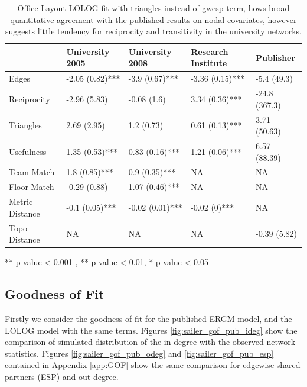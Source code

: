\documentclass[
]{statsoc}
\begin{document}
\begin{table}

\caption{\label{tab:unnamed-chunk-5}\label{tab:sailer_lolog_tri} Office Layout LOLOG fit with triangles instead of gwesp term, hows broad quantitative agreement with the published results on nodal covariates, however suggests little tendency for reciprocity and transitivity in the university networks.}
\centering
\begin{threeparttable}
\begin{tabular}[t]{lllll}
\toprule
  & University 2005 & University 2008 & Research Institute & Publisher\\
\midrule
\rowcolor{gray!6}  Edges & -2.05 (0.82)*** & -3.9 (0.67)*** & -3.36 (0.15)*** & -5.4 (49.3)\\
Reciprocity & -2.96 (5.83) & -0.08 (1.6) & 3.34 (0.36)*** & -24.8 (367.3)\\
\rowcolor{gray!6}  Triangles & 2.69 (2.95) & 1.2 (0.73) & 0.61 (0.13)*** & 3.71 (50.63)\\
Usefulness & 1.35 (0.53)*** & 0.83 (0.16)*** & 1.21 (0.06)*** & 6.57 (88.39)\\
\rowcolor{gray!6}  Team Match & 1.8 (0.85)*** & 0.9 (0.35)*** & NA & NA\\
\addlinespace
Floor Match & -0.29 (0.88) & 1.07 (0.46)*** & NA & NA\\
\rowcolor{gray!6}  Metric Distance & -0.1 (0.05)*** & -0.02 (0.01)*** & -0.02 (0)*** & NA\\
Topo Distance & NA & NA & NA & -0.39 (5.82)\\
\bottomrule
\end{tabular}
\begin{tablenotes}
\item *** p-value < 0.001 , ** p-value < 0.01, * p-value < 0.05
\end{tablenotes}
\end{threeparttable}
\end{table}

\subsection{Goodness of Fit}

Firstly we consider the goodness of fit for the published ERGM model,
and the LOLOG model with the same terms. Figures
\ref{fig:sailer_gof_pub_ideg} show the comparison of simulated
distribution of the in-degree with the observed network statistics.
Figures \ref{fig:sailer_gof_pub_odeg} and \ref{fig:sailer_gof_pub_esp}
contained in Appendix \ref{app:GOF} show the same comparison for
edgewise shared partners (ESP) and out-degree.
\end{document}
